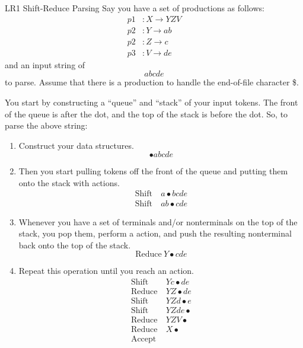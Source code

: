 \begin{example}[]{LR1 Shift-Reduce Parsing}
  Say you have a set of productions as follows:
  \begin{align*}
    p1&: X \rightarrow YZV \\
    p2&: Y \rightarrow ab \\
    p2&: Z \rightarrow c \\
    p3&: V \rightarrow de
  \end{align*}
  and an input string of
  \begin{equation*}
    abcde
  \end{equation*}
  to parse.
  Assume that there is a production to handle the end-of-file character \$.

  \tcblower

  You start by constructing a ``queue'' and ``stack'' of your input tokens.
  The front of the queue is after the dot, and the top of the stack is before the dot.
  So, to parse the above string:
  \begin{enumerate}[noitemsep]
  \item Construct your data structures.
    \begin{equation*}
      \bullet abcde
    \end{equation*}
  \item Then you start pulling tokens off the front of the queue and putting them onto the stack with  actions.
    \begin{align*}
      \text{Shift}& \: a \bullet bcde \\
      \text{Shift}& \: ab \bullet cde
    \end{align*}
  \item Whenever you have a set of terminals and/or nonterminals on the top of the stack, you pop them, perform a  action, and push the resulting nonterminal back onto the top of the stack.
    \begin{equation*}
      \text{Reduce} \: Y \bullet cde
    \end{equation*}
  \item Repeat this operation until you reach an  action.
    \begin{align*}
      \text{Shift}& \: Yc \bullet de \\
      \text{Reduce}& \: YZ \bullet de \\
      \text{Shift}& \: YZd \bullet e \\
      \text{Shift}& \: YZde \bullet \\
      \text{Reduce}& \: YZV \bullet \\
      \text{Reduce}& \: X \bullet \\
      \text{Accept}&
    \end{align*}
  \end{enumerate}
\end{example}

